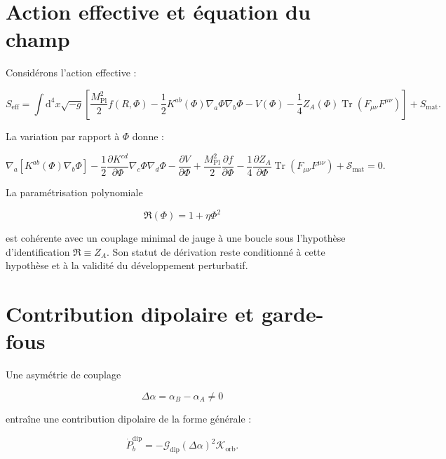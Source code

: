 \documentclass[11pt,a4paper]{article}
\begin{document}
\section{Action effective et équation du champ}

Considérons l'action effective :

\begin{equation}
S_{\mathrm{eff}}
=
\int \mathrm d^4x\sqrt{-g}
\left[
\frac{M_{\mathrm{Pl}}^2}{2}f(R,\Phi)
-\frac12K^{ab}(\Phi)\nabla_a\Phi\nabla_b\Phi
-V(\Phi)
-\frac14Z_A(\Phi)\operatorname{Tr}(F_{\mu\nu}F^{\mu\nu})
\right]
+S_{\mathrm{mat}} .
\end{equation}

La variation par rapport à $\Phi$ donne :

\begin{equation}
\nabla_a\left[K^{ab}(\Phi)\nabla_b\Phi\right]
-\frac12\frac{\partial K^{cd}}{\partial\Phi}\nabla_c\Phi\nabla_d\Phi
-\frac{\partial V}{\partial\Phi}
+\frac{M_{\mathrm{Pl}}^2}{2}\frac{\partial f}{\partial\Phi}
-\frac14\frac{\partial Z_A}{\partial\Phi}
\operatorname{Tr}(F_{\mu\nu}F^{\mu\nu})
+\mathcal S_{\mathrm{mat}}
=0 .
\end{equation}

La paramétrisation polynomiale

\begin{equation}
\mathfrak R(\Phi)=1+\eta\Phi^2
\end{equation}

est cohérente avec un couplage minimal de jauge à une boucle sous l'hypothèse d'identification $\mathfrak R\equiv Z_A$. Son statut de dérivation reste conditionné à cette hypothèse et à la validité du développement perturbatif.

\section{Contribution dipolaire et garde-fous}

Une asymétrie de couplage

\begin{equation}
\Delta\alpha=\alpha_B-\alpha_A\neq0
\end{equation}

entraîne une contribution dipolaire de la forme générale :

\begin{equation}
\dot P_b^{\mathrm{dip}}
=
-\mathcal G_{\mathrm{dip}}
(\Delta\alpha)^2
\mathcal K_{\mathrm{orb}} .
\end{equation}
\end{document}

